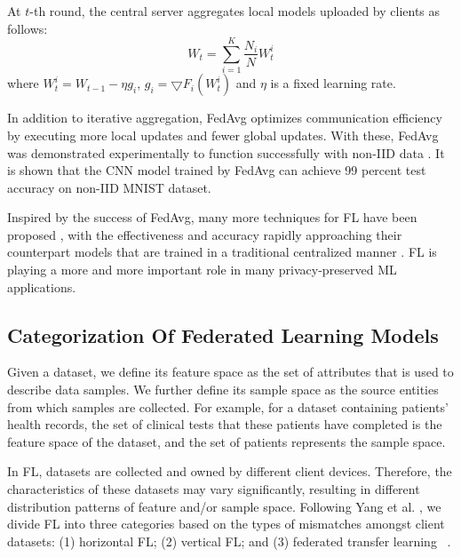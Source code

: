 \documentclass[10pt,journal,compsoc]{IEEEtran}
\begin{document}
At $t$-th round, the central server aggregates local models uploaded by clients as follows:
\begin{equation}
	W_{t}= \sum_{i=1}^{K} \frac{N_{i}}{N} W_{t}^{i} 
\end{equation}
where $W_{t}^{i}=W_{t-1}-\eta g_{i}$, $ g_{i}=\bigtriangledown  F_{i}(W_{t}^{i}) $ and $  \eta $  is a fixed learning rate.

In addition to iterative aggregation, FedAvg optimizes communication efficiency by executing more local updates and fewer global updates. With these, FedAvg was demonstrated experimentally to function successfully with non-IID data \cite{nguyen2020efficient}. It is shown that the CNN model trained by FedAvg can achieve 99 percent test accuracy on non-IID MNIST dataset.

Inspired by the success of FedAvg, many more techniques for FL have been proposed \cite{zhang2021survey}, with the effectiveness and accuracy rapidly approaching their counterpart models that are trained in a traditional centralized manner \cite{konevcny2016federated}. FL is playing a more and more important role in many privacy-preserved ML applications.
\vspace{-0.2cm}

\subsection{Categorization Of Federated Learning Models}
Given a dataset, we define its feature space as the set of attributes that is used to describe data samples. We further define its sample space as the source entities from which samples are collected. For example, for a dataset containing patients' health records, the set of clinical tests that these patients have completed is the feature space of the dataset, and the set of patients represents the sample space.

In FL, datasets are collected and owned by different client devices. Therefore, the characteristics of these datasets may vary significantly, resulting in different distribution patterns of feature and/or sample space. Following Yang et al. \cite{yang2019federated}, we divide FL into three categories based on the types of mismatches amongst client datasets: (1) horizontal FL; (2) vertical FL; and (3) federated transfer learning~\cite{zhang2021survey} \cite{yang2019federated} \cite{khan2021federated}. 
\end{document}
